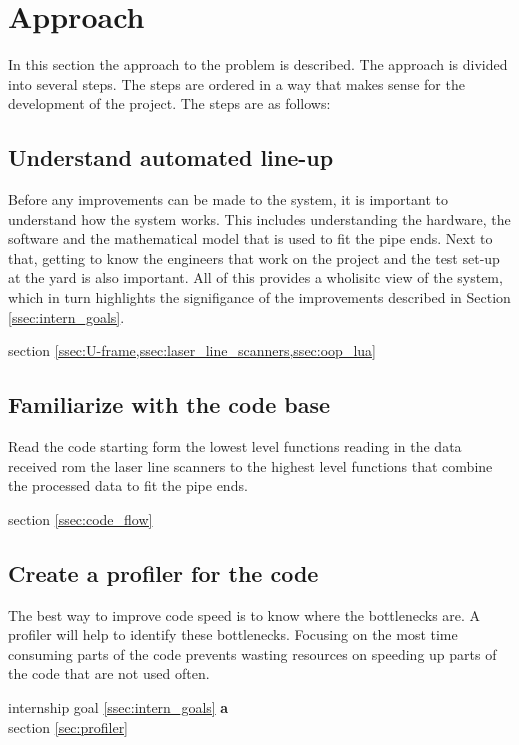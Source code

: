 \section{Approach} \label{sec:approach}
In this section the approach to the problem is described. The approach is divided into several steps.
The steps are ordered in a way that makes sense for the development of the project. The steps are as follows:

\subsection{Understand automated line-up} \label{ssec:understand_lua}
Before any improvements can be made to the system, it is important to understand how the system works.
This includes understanding the hardware, the software and the mathematical model that is used to fit the pipe ends.
Next to that, getting to know the engineers that work on the project and the test set-up at the yard is also important.
All of this provides a wholisitc view of the system, which in turn highlights the signifigance of the improvements described
in Section \ref{ssec:intern_goals}.
\begin{flushright}
    \large{} section \cref{ssec:U-frame,ssec:laser_line_scanners,ssec:oop_lua}
\end{flushright}

\subsection{Familiarize with the code base} \label{ssec:familiarize_code}
Read the code starting form the lowest level functions reading in the data received rom the laser line scanners to
the highest level functions that combine the processed data to fit the pipe ends.
\begin{flushright}
    \large{} section \ref{ssec:code_flow}
\end{flushright}

\subsection{Create a profiler for the code} \label{ssec:profiler}
The best way to improve code speed is to know where the bottlenecks are. A profiler will help to identify these bottlenecks. Focusing
on the most time consuming parts of the code prevents wasting resources on speeding up parts of the code that are not used often.
\begin{flushright}
     internship goal \ref{ssec:intern_goals} \textbf{a}\\
    \large{} section \ref{sec:profiler}
\end{flushright}

